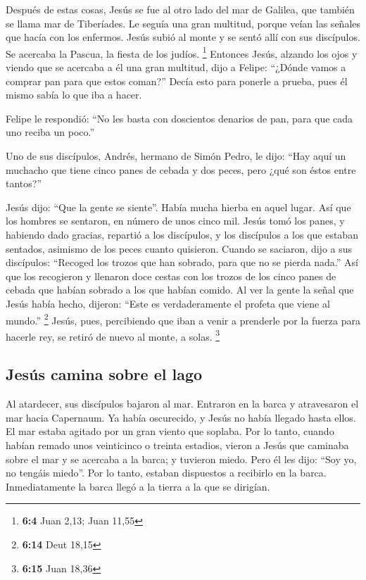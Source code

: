 \begin{paracol}{2}
 Después de estas cosas, Jesús se fue al otro lado del mar
de Galilea, que también se llama mar de Tiberíades.  Le
seguía una gran multitud, porque veían las señales que hacía con los
enfermos.  Jesús subió al monte y se sentó allí con sus
discípulos.  Se acercaba la Pascua, la fiesta de los
judíos. \footnote{\textbf{6:4} Juan 2,13; Juan 11,55} 
Entonces Jesús, alzando los ojos y viendo que se acercaba a él una gran
multitud, dijo a Felipe: ``¿Dónde vamos a comprar pan para que estos
coman?''  Decía esto para ponerle a prueba, pues él mismo
sabía lo que iba a hacer.

 Felipe le respondió: ``No les basta con doscientos
denarios de pan, para que cada uno reciba un poco.''

 Uno de sus discípulos, Andrés, hermano de Simón Pedro, le
dijo:  ``Hay aquí un muchacho que tiene cinco panes de
cebada y dos peces, pero ¿qué son éstos entre tantos?''

 Jesús dijo: ``Que la gente se siente''. Había mucha
hierba en aquel lugar. Así que los hombres se sentaron, en número de
unos cinco mil.  Jesús tomó los panes, y habiendo dado
gracias, repartió a los discípulos, y los discípulos a los que estaban
sentados, asimismo de los peces cuanto quisieron.  Cuando
se saciaron, dijo a sus discípulos: ``Recoged los trozos que han
sobrado, para que no se pierda nada.''  Así que los
recogieron y llenaron doce cestas con los trozos de los cinco panes de
cebada que habían sobrado a los que habían comido.  Al
ver la gente la señal que Jesús había hecho, dijeron: ``Este es
verdaderamente el profeta que viene al mundo.'' \footnote{\textbf{6:14}
  Deut 18,15}  Jesús, pues, percibiendo que iban a venir
a prenderle por la fuerza para hacerle rey, se retiró de nuevo al monte,
a solas. \footnote{\textbf{6:15} Juan 18,36}

\hypertarget{jesuxfas-camina-sobre-el-lago}{%
\subsection{Jesús camina sobre el
lago}\label{jesuxfas-camina-sobre-el-lago}}

 Al atardecer, sus discípulos bajaron al mar.
 Entraron en la barca y atravesaron el mar hacia
Capernaum. Ya había oscurecido, y Jesús no había llegado hasta ellos.
 El mar estaba agitado por un gran viento que soplaba.
 Por lo tanto, cuando habían remado unos veinticinco o
treinta estadios, vieron a Jesús que caminaba sobre el mar y se acercaba
a la barca; y tuvieron miedo.  Pero él les dijo: ``Soy
yo, no tengáis miedo''.  Por lo tanto, estaban dispuestos
a recibirlo en la barca. Inmediatamente la barca llegó a la tierra a la
que se dirigían.


\end{paracol}
